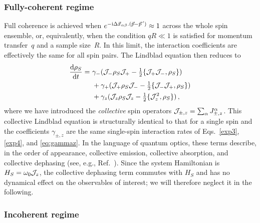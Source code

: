 \documentclass[aps,prd,10pt,twocolumn,superscriptaddress,floatfix,nofootinbib,amsmath,amssymb,altaffilletter,preprintnumbers]{revtex4-1}
\begin{document}


\subsubsection*{Fully-coherent regime}

Full coherence is achieved when $e^{-{\rm i} \Delta \vec{x}_{\alpha \beta} .(\vec{p} - \vec{p}\,')} \approx 1$ across the whole spin ensemble, or, equivalently, when the condition $qR \ll 1$ is satisfied for momentum transfer~$q$ and a sample size~$R$.  In this limit, the interaction coefficients are effectively the same for all spin pairs. The Lindblad equation then reduces to 
\begin{equation}
\begin{aligned}
\frac{{\rm d}\rho_S}{{\rm d} t} = ~&\gamma_{-}({\cal J}_- \rho_S {\cal J}_+ - \tfrac{1}{2} \{{\cal J}_+ {\cal J}_-,\rho_S\}) \\
&+ \gamma_{+}({\cal J}_+ \rho_S {\cal J}_- - \tfrac{1}{2} \{{\cal J}_- {\cal J}_+,\rho_S\})  \\
&+ \gamma_{z}({\cal J}_z \rho_S {\cal J}_z - \tfrac{1}{2} \{{\cal J}_z^2,\rho_S\})\, ,
\label{lin12}
\end{aligned}
\end{equation}
where we have introduced the \emph{collective} spin operators  ${\cal J}_{\pm, z} = \sum_\alpha J_{\pm, z}^{\alpha}$.  This collective Lindblad equation is structurally identical to that for a single spin and the coefficients $\gamma_{\pm,z}$ are the same single-spin interaction rates of Eqs.~\eqref{exp3}, \eqref{exp4}, and \eqref{eq:gammaz}.
In the language of quantum optics, these terms describe, in the order of appearance, collective emission, collective absorption, and collective dephasing (see, e.g., Ref.~\cite{PhysRevA.98.063815}). Since the system Hamiltonian is $H_S = \omega_0 {\cal J}_z$, the collective dephasing term commutes with $H_S$ and has no dynamical effect on the observables of interest; we will therefore neglect it in the following. 



\subsubsection*{Incoherent regime}
\end{document}
